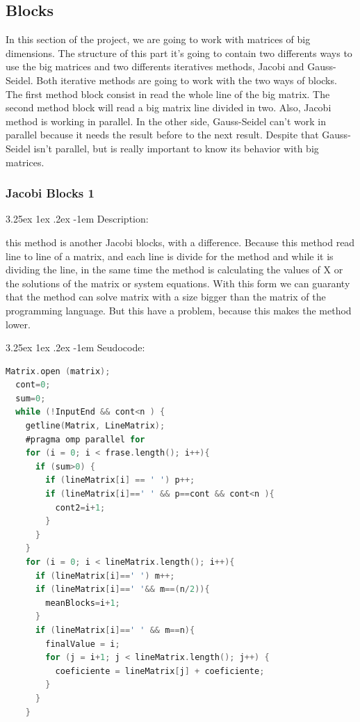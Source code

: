 \documentclass{article}
\makeatletter
\renewcommand\paragraph{\@startsection{paragraph}{5}{\z@}%
  {3.25ex \@plus1ex \@minus.2ex}%
  {-1em}%
  {\normalfont\normalsize\bfseries}}
\makeatother
\begin{document}
\subsection{Blocks}

In this section of the project, we are going to work with matrices of big dimensions. The structure of this part it's going to contain two differents ways to use the big matrices and two differents iteratives methods, Jacobi and Gauss-Seidel. Both iterative methods are going to work with the two ways of blocks. The first method block consist in read the whole line of the big matrix. The second method block will read a big matrix line divided in two. Also, Jacobi method is working in parallel. In the other side, Gauss-Seidel can't work in parallel because it needs the result before to the next result. Despite that Gauss-Seidel isn't parallel, but is really important to know its behavior with big matrices.

\subsubsection{Jacobi Blocks 1}


\paragraph{Description:}
\hfill \break

this method is another Jacobi blocks, with a difference. Because this method read line to line of a matrix, and each line is divide for the method and while it is dividing the line, in the same time the method is calculating the values of X or the solutions of the matrix or system equations. With this form we can guaranty that the method can solve matrix with a size bigger than the matrix of the programming language. But this have a problem, because this makes the method lower.

\paragraph{Seudocode:}
\hfill \break

\begin{lstlisting}[language=C]
  Matrix.open (matrix);
  cont=0;
  sum=0;
  while (!InputEnd && cont<n ) {
    getline(Matrix, LineMatrix);
    #pragma omp parallel for 
    for (i = 0; i < frase.length(); i++){
      if (sum>0) {
        if (lineMatrix[i] == ' ') p++;
        if (lineMatrix[i]==' ' && p==cont && cont<n ){
          cont2=i+1;
        }
      }
    }
    for (i = 0; i < lineMatrix.length(); i++){
      if (lineMatrix[i]==' ') m++;
      if (lineMatrix[i]==' '&& m==(n/2)){
        meanBlocks=i+1;
      }
      if (lineMatrix[i]==' ' && m==n){
        finalValue = i;
        for (j = i+1; j < lineMatrix.length(); j++) {
          coeficiente = lineMatrix[j] + coeficiente;
        }
      }
    }
\end{lstlisting}
\end{document}
